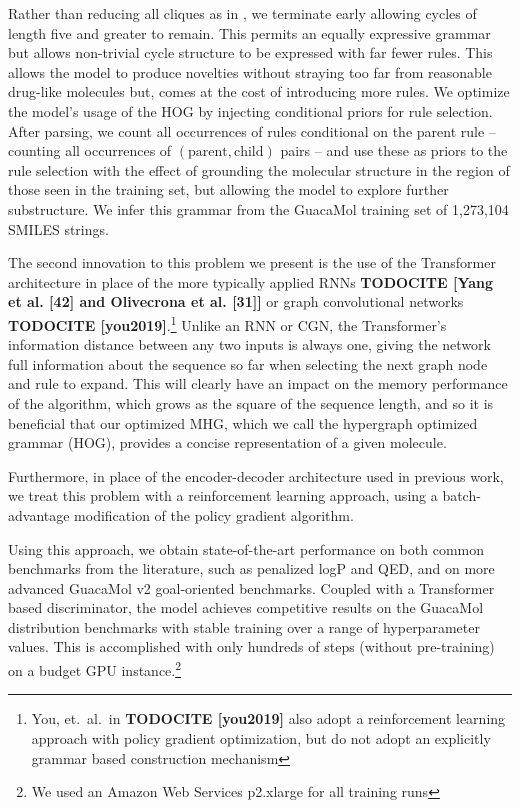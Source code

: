 \documentclass{article}
\newcommand{\CITE}[1]{{\bf TODOCITE [#1]}}
\begin{document}
Rather than reducing all cliques as in \cite{kajino2018}, we terminate early allowing cycles of length five and greater to remain. This permits an equally expressive grammar but allows non-trivial cycle structure to be expressed with far fewer rules. This allows the model to produce novelties without straying too far from reasonable drug-like molecules but, comes at the cost of introducing more rules. We optimize the model's usage of the HOG by injecting conditional priors for rule selection. After parsing, we count all occurrences of rules conditional on the parent rule -- counting all occurrences of $(\text{parent}, \text{child})$ pairs -- and use these as priors to the rule selection with the effect of grounding the molecular structure in the region of those seen in the training set, but allowing the model to explore further substructure. We infer this grammar from the GuacaMol \cite{pogany2019} training set of 1,273,104 SMILES strings.

The second innovation to this problem we present is the use of the Transformer architecture \cite{vaswani2017} in place of the more typically applied RNNs \CITE{Yang et al. [42] and Olivecrona et al. [31]} or graph convolutional networks \CITE{you2019}.\footnote{You, et.~al.~in \CITE{you2019} also adopt a reinforcement learning approach with policy gradient optimization, but do not adopt an explicitly grammar based construction mechanism} Unlike an RNN or CGN, the Transformer's information distance between any two inputs is always one, giving the network full information about the sequence so far when selecting the next graph node and rule to expand. This will clearly have an impact on the memory performance of the algorithm, which grows as the square of the sequence length, and so it is beneficial that our optimized MHG, which we call the hypergraph optimized grammar (HOG), provides a concise representation of a given molecule.

Furthermore, in place of the encoder-decoder architecture used in previous work, we treat this problem with a reinforcement learning approach, using a batch-advantage modification of the policy gradient algorithm.

Using this approach, we obtain state-of-the-art performance on both common benchmarks from the literature, such as penalized logP and QED, and on more advanced GuacaMol v2 goal-oriented benchmarks. Coupled with a Transformer based discriminator, the model achieves competitive results on the GuacaMol distribution benchmarks with stable training over a range of hyperparameter values. This is accomplished with only hundreds of steps (without pre-training) on a budget GPU instance.\footnote{We used an Amazon Web Services p2.xlarge for all training runs}
\end{document}
